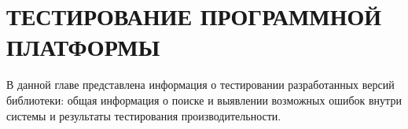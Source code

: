 \chapter{ТЕСТИРОВАНИЕ ПРОГРАММНОЙ ПЛАТФОРМЫ}

В данной главе представлена информация о тестировании 
разработанных версий библиотеки: общая информация о поиске и 
выявлении возможных ошибок внутри системы и результаты 
тестирования производительности.




